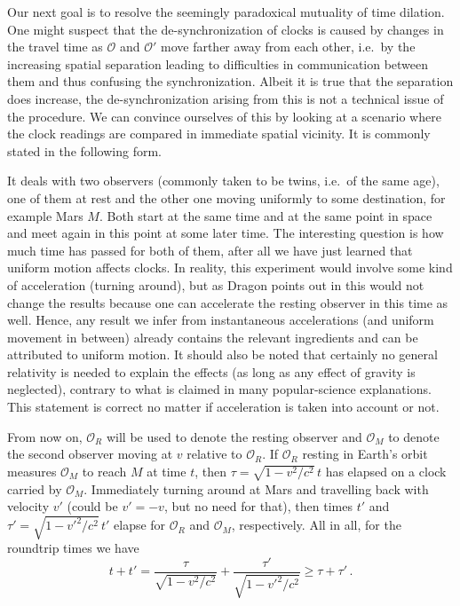 Our next goal is to resolve the seemingly paradoxical mutuality of time dilation. One might suspect that the de-synchronization of clocks is caused by changes in the travel time as $\mathcal{O}$ and $\mathcal{O}'$ move farther away from each other, i.e.~by the increasing spatial separation leading to difficulties in communication between them and thus confusing the synchronization. Albeit it is true that the separation does increase, the de-synchronization arising from this is not a technical issue of the procedure. We can convince ourselves of this by looking at a scenario where the clock readings are compared in immediate spatial vicinity. It is commonly stated in the following form.
\begin{ex}\label{ex:twin_paradox_1}
	It deals with two observers (commonly taken to be twins, i.e.~of the same age), one of them at rest and the other one moving uniformly to some destination, for example Mars $M$. Both start at the same time and at the same point in space and meet again in this point at some later time. The interesting question is how much time has passed for both of them, after all we have just learned that uniform motion affects clocks. In reality, this experiment would involve some kind of acceleration (turning around), but as Dragon points out in \cite{dragon_geometry_srt} this would not change the results because one can accelerate the resting observer in this time as well. Hence, any result we infer from instantaneous accelerations (and uniform movement in between) already contains the relevant ingredients and can be attributed to uniform motion. It should also be noted that certainly no general relativity is needed to explain the effects (as long as any effect of gravity is neglected), contrary to what is claimed in many popular-science explanations. This statement is correct no matter if acceleration is taken into account or not.
	
	From now on, $\mathcal{O}_R$ will be used to denote the resting observer and $\mathcal{O}_M$ to denote the second observer moving at $v$ relative to $\mathcal{O}_R$. If $\mathcal{O}_R$ resting in Earth's orbit measures $\mathcal{O}_M$ to reach $M$ at time $t$, then $\tau = \sqrt{1 - v^2 / c^2} \, t$ has elapsed on a clock carried by $\mathcal{O}_M$. Immediately turning around at Mars and travelling back with velocity $v'$ (could be $v' = -v$, but no need for that), then times $t'$ and $\tau' = \sqrt{1 - v'^2 / c^2} \, t'$ elapse for $\mathcal{O}_R$ and $\mathcal{O}_M$, respectively. All in all, for the roundtrip times we have
	\begin{equation*}
		t + t' = \frac{\tau}{\sqrt{1 - v^2 / c^2}} + \frac{\tau'}{\sqrt{1 - v'^2 / c^2}} \geq \tau + \tau' \, .
	\end{equation*}


\end{ex}
